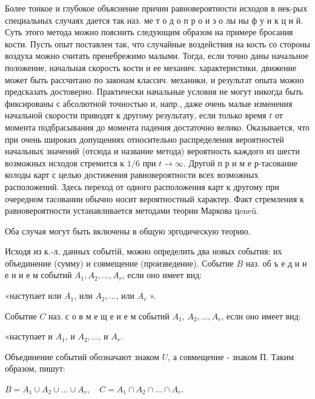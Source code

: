 \documentclass[10pt]{article}
\begin{document}
Более тонкое и глубокое объяснение причин равновероятности исходов в нек-рых специальных случаях дается так наз. ме т о д о п р о и з о лы ны ф у н к ц и й. Суть этого метода можно пояснить следующим образом на примере бросания кости. Пусть опыт поставлен так, что случайные воздействия на кость со стороны воздуха можно считать пренебрежимо малыми. Тогда, если точно даны начальное положение, начальная скорость кости и ее механич. характеристики, движение может быть рассчитано по законам классич. механики, и результат опыта можно предсказать достоверно. Практически начальные условия не могут никогда быть фиксированы с абсолютной точностью и, напр., даже очень малые изменения начальной скорости приводят к другому результату, если только время $t$ от момента подбрасывания до момента падения достаточно велико. Оказывается, что при очень широких допущениях относительно распределения вероятностей начальных значений (отсюда и название метода) вероятность каждого из шести возможных исходов стремится к $1 / 6$ при $t \rightarrow \infty$. Другой п р и м е р-тасование колоды карт с целью достижения равновероятности всех возможных расположений. Здесь переход от одного расположения карт к другому при очередном тасовании обычно носит вероятностный характер. Факт стремления к равновероятности устанавливается методами теории Маркова цeneŭ.



Оба случая могут быть включены в общую эргодическую теорию.



Исходя из к.-л. данных событій, можно определить два новых события: их объединение (сумму) и совмещение (произведение). Событие $B$ наз. об ъ е д и н е н и е м событий $A_{1}, A_{2}, \ldots, A_{r}$, если оно имеет вид:



«наступает или $A_{1}$, или $A_{2}, \ldots$, или $A_{r}$ ».



Событие $C$ наз. с о в м е щ е и е м событий $A_{1}$, $A_{2}, \ldots, A_{r}$, если оно имеет вид:



«наступает и $A_{1}$, и $A_{2}, \ldots$, и $A_{r}$.



Объединение событий обозначают знаком $U$, а совмещение - знаком П. Таким образом, пишут:



$B=A_{1} \cup A_{2} \cup \ldots \cup A_{r}, \quad C=A_{1} \cap A_{2} \cap \ldots \cap A_{r}$.
\end{document}
